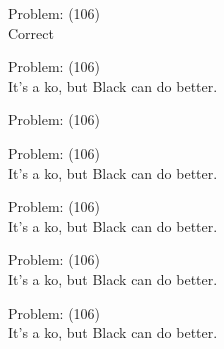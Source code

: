\documentclass[11pt]{article}
\begin{document}
\begin{minipage}[t]{0.5\textwidth}
  {\centering
  
Problem: (106)\\
Correct\\
  }
\end{minipage}
\begin{minipage}[t]{0.5\textwidth}
  {\centering
  
Problem: (106)\\
It's a ko, but Black can do better.\\
  }
\end{minipage}
\begin{minipage}[t]{0.5\textwidth}
  {\centering
  
Problem: (106)\\
  }
\end{minipage}
\begin{minipage}[t]{0.5\textwidth}
  {\centering
  
Problem: (106)\\
It's a ko, but Black can do better.\\
  }
\end{minipage}
\begin{minipage}[t]{0.5\textwidth}
  {\centering
  
Problem: (106)\\
It's a ko, but Black can do better.\\
  }
\end{minipage}
\begin{minipage}[t]{0.5\textwidth}
  {\centering
  
Problem: (106)\\
It's a ko, but Black can do better.\\
  }
\end{minipage}
\begin{minipage}[t]{0.5\textwidth}
  {\centering
  
Problem: (106)\\
It's a ko, but Black can do better.\\
  }
\end{minipage}
\end{document}
